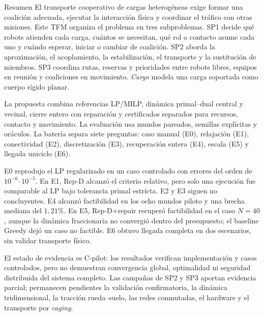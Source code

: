 \begin{viuabstract}{Resumen}
El transporte cooperativo de cargas heterogéneas exige formar una coalición adecuada,
ejecutar la interacción física y coordinar el tráfico con otras misiones. Este TFM
organiza el problema en tres subproblemas. SP1 decide qué robots atienden cada carga,
cuántos se necesitan, qué rol o contacto asume cada uno y cuándo esperar, iniciar o
cambiar de coalición. SP2 aborda la aproximación, el acoplamiento, la estabilización,
el transporte y la sustitución de miembros. SP3 coordina rutas, reservas y prioridades
entre robots libres, equipos en reunión y coaliciones en movimiento. \emph{Cargo}
modela una carga soportada como cuerpo rígido planar.

La propuesta combina referencias LP/MILP, dinámica primal--dual central y
vecinal, cierre entero con reparación y certificados separados para recursos,
contacto y movimiento. La evaluación usa mundos pareados, semillas explícitas y
oráculos. La batería separa siete preguntas: caso manual (E0),
relajación (E1), conectividad (E2), discretización (E3), recuperación entera (E4),
escala (E5) y llegada uniciclo (E6).

E0 reprodujo el LP regularizado en un caso controlado con errores del orden de
\(10^{-6}\)--\(10^{-5}\). En E1, Rep-D alcanzó el criterio relativo,
pero solo una ejecución fue comparable al LP bajo tolerancia primal estricta.
E2 y E3 siguen no concluyentes. E4 alcanzó factibilidad en los ocho mundos piloto y una brecha mediana
del \(1{,}21\%\). En E5, Rep-D+repair recuperó factibilidad en el caso \(N=40\),
aunque la dinámica fraccionaria no convergió dentro del presupuesto; el baseline
Greedy dejó un caso no factible. E6 obtuvo llegada completa en dos escenarios, sin
validar transporte físico.

El estado de evidencia es C-pilot: los resultados verifican implementación y casos
controlados, pero no demuestran convergencia global, optimalidad ni seguridad
distribuida del sistema completo. Las campañas de SP2 y SP3 aportan evidencia
parcial; permanecen pendientes la validación confirmatoria, la dinámica tridimensional,
la tracción rueda--suelo, las redes conmutadas, el hardware y el transporte por
\emph{caging}.

\end{viuabstract}

\clearpage
